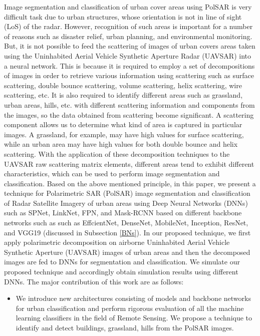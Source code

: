 \documentclass[a4paper,12pt]{spieman}  %
\begin{document}
\begin{spacing}{1}
Image segmentation and classification of urban cover areas using PolSAR is very difficult task due to urban structures, whose orientation is not in line of sight (LoS) of the radar. However, recognition of such areas is important for a number of reasons such as disaster relief, urban planning, and environmental monitoring. But, it is not possible to feed the scattering of images of urban covers areas taken using the Uninhabited Aerial Vehicle Synthetic Aperture Radar (UAVSAR) into a neural network. This is because it is required to employ a set of decompositions of images in order to retrieve various information using scattering such as surface scattering, double bounce scattering, volume scattering, helix scattering, wire scattering, etc. It is also required to identify different areas such as grassland, urban areas, hills, etc.  with different scattering information and components from the images, so the data obtained from scattering become significant. A scattering component allows us to determine what kind of area is captured in particular images. A grassland, for example, may have high values for surface scattering, while an urban area may have high values for both double bounce and helix scattering.
With the application of these decomposition techniques to the UAVSAR raw scattering matrix elements, different areas tend to exhibit different characteristics, which can be used to perform image segmentation and classification. Based on the above mentioned principle, in this paper, we present a technique for Polarimetric SAR (PolSAR) image segmentation and classification of Radar Satellite Imagery of urban areas using Deep Neural Networks (DNNs) such as SPNet, LinkNet, FPN, and Mask-RCNN based on different backbone networks such as such as EffcientNet, DenseNet, MobileNet, Inception, ResNet, and VGG19 (discussed in Subsection \ref{BNs}). In our proposed technique, we first apply polarimetric decomposition on airborne Uninhabited Aerial Vehicle Synthetic Aperture (UAVSAR) images of urban areas and then the decomposed images are fed to DNNs for segmentation and classification. We simulate our proposed technique and accordingly obtain simulation results using different DNNs.
 The major contribution of this work are as follows:
\begin{itemize}
    \item We introduce new architectures consisting of models and backbone networks for urban classification and perform rigorous evaluation of all the machine learning classifiers in the field of Remote Sensing. We propose a technique to identify and detect buildings, grassland, hills from the PolSAR images.

\end{itemize}
\end{spacing}
\end{document}
